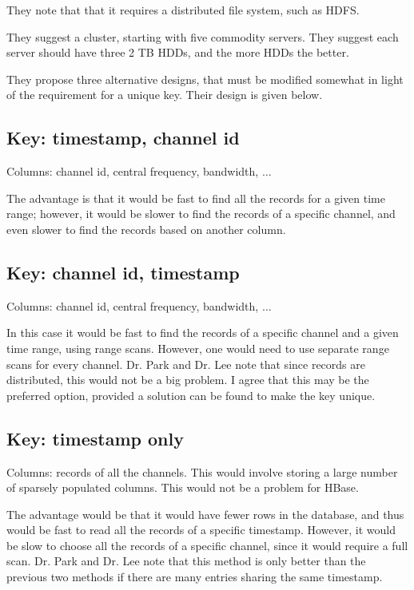 \documentclass{article}
\begin{document}
They note that that it requires a distributed file system, such as HDFS.

They suggest a cluster, starting with five commodity servers. They
suggest each server should have three 2 TB HDDs, and the more HDDs the
better.

They propose three alternative designs, that must be modified somewhat
in light of the requirement for a unique key. Their design is given below.

\subsection{Key: timestamp, channel id}

Columns: channel id, central frequency, bandwidth, $\ldots$

The advantage is that it would be fast to find all the records for a
given time range; however, it would be slower to find the records of a
specific channel, and even slower to find the records based on another
column.

\subsection{Key: channel id, timestamp}

Columns: channel id, central frequency, bandwidth, $\ldots$

In this case it would be fast to find the records of a specific channel and a given time range, using range scans. However, one would need to use separate range scans for every channel. Dr. Park and Dr. Lee note that since records are distributed, this would not be a big problem. I agree that this may be the preferred option, provided a solution can be found to make the key unique.

\subsection{Key: timestamp only}

Columns: records of all the channels. This would involve storing a large number of sparsely populated columns. This would not be a problem for HBase.

The advantage would be that it would have fewer rows in the database,
and thus would be fast to read all the records of a specific
timestamp. However, it would be slow to choose all the records of a
specific channel, since it would require a full scan. Dr. Park and
Dr. Lee note that this method is only better than the previous two
methods if there are many entries sharing the same timestamp.
\end{document}
